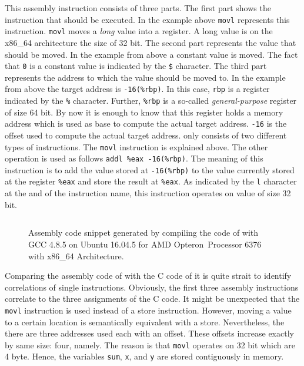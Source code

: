 \documentclass[onecolumn, openright, master, english, signatures]{dbrgrptt}
\begin{document}
This assembly instruction consists of three parts. The first part shows the instruction that should be executed. In the example above \texttt{movl} represents this instruction. \texttt{movl} moves a \emph{long} value into a register. A long value is on the x86\_64 architecture the size of 32 bit. The second part represents the value that should be moved. In the example from above a constant value is moved. The fact that \texttt{0} is a constant value is indicated by the \texttt{\$} character. The third part represents the address to which the value should be moved to. In the example from above the target address is \texttt{-16(\%rbp)}. In this case, \texttt{rbp} is a register indicated by the \texttt{\%} character. Further, \texttt{\%rbp} is a so-called \emph{general-purpose} register of size 64 bit. By now it is enough to know that this register holds a memory address which is used as base to compute the actual target address. \texttt{-16} is the offset used to compute the actual target address.
 only consists of two different types of instructions. The \texttt{movl} instruction is explained above. The other operation is used as follows \texttt{addl \%eax -16(\%rbp)}. The meaning of this instruction is to add the value stored at \texttt{-16(\%rbp)} to the value currently stored at the register \texttt{\%eax} and store the result at \texttt{\%eax}. As indicated by the \texttt{l} character at the and of the instruction name, this instruction operates on value of size 32 bit.

\begin{figure}[!ht]
  \centering
  \begin{tabular}{c}
  
  \end{tabular}
  \caption{Assembly code snippet generated by compiling the code of  with GCC 4.8.5 on Ubuntu 16.04.5 for AMD Opteron\texttrademark~Processor 6376 with x86\_64 Architecture.}
  \label{fig:mat-example-assembly-code}
\end{figure}

Comparing the assembly code of  with the C code of  it is quite strait to identify correlations of single instructions. Obviously, the first three assembly instructions correlate to the three assignments of the C code. It might be unexpected that the \texttt{movl} instruction is used instead of a store instruction. However, moving a value to a certain location is semantically equivalent with a store. Nevertheless, the there are three addresses used each with an offset. These offsets increase exactly by same size: four, namely. The reason is that \texttt{movl} operates on 32 bit which are 4 byte. Hence, the variables \texttt{sum}, \texttt{x}, and \texttt{y} are stored contiguously in memory.
\end{document}
